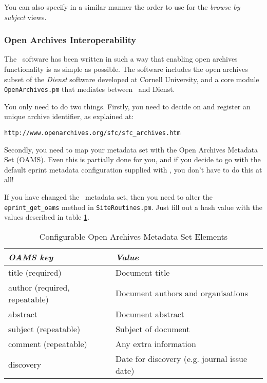 {You can also specify in a similar manner the order to use for the \emph{browse by subject} views.


\subsubsection{Open Archives Interoperability}

The \eprints\ software has been written in such a way that enabling open archives functionality is as simple as possible. The software includes the open archives subset of the \emph{Dienst} software developed at Cornell University, and a core module {\tt OpenArchives.pm} that mediates between \eprints\ and Dienst.

You only need to do two things. Firstly, you need to decide on and register an unique archive identifier, as explained at:

\begin{verbatim}
http://www.openarchives.org/sfc/sfc_archives.htm
\end{verbatim}

Secondly, you need to map your metadata set with the Open Archives Metadata Set (OAMS). Even this is partially done for you, and if you decide to go with the default eprint metadata configuration supplied with \eprints, you don't have to do this at all!

If you have changed the \eprints\ metadata set, then you need to alter the {\tt eprint\_get\_oams} method in {\tt SiteRoutines.pm}. Just fill out a hash value with the values described in table \ref{install_oams_hash}.

\begin{table}
\begin{center}
\begin{tabular}{|l|l|}
\hline
\emph{OAMS key}               & \emph{Value}                                 \\
\hline
title (required)              & Document title                               \\
author (required, repeatable) & Document authors and organisations           \\
abstract                      & Document abstract                            \\
subject (repeatable)          & Subject of document                          \\
comment (repeatable)          & Any extra information                        \\
discovery                     & Date for discovery (e.g. journal issue date) \\
\hline
\end{tabular}
\caption{\label{install_oams_hash} Configurable Open Archives Metadata Set Elements}
\end{center}
\end{table}

}
